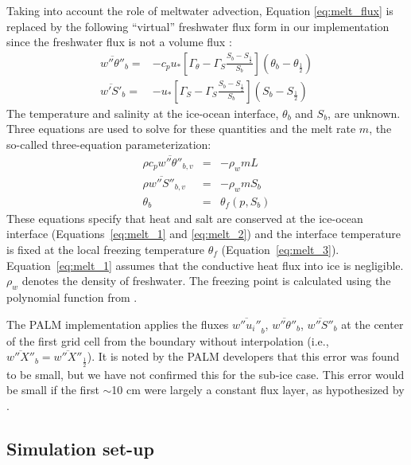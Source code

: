 \documentclass[draft]{styles/agujournal2019}
\begin{document}
Taking into account the role of meltwater advection, Equation \ref{eq:melt_flux} is replaced by the following ``virtual'' freshwater flux form in our implementation since the freshwater flux is not a volume flux \cite{jenkins_role_2001, asay-davis_experimental_2016}:
\begin{eqnarray}
    \overline{w''\theta''}_b =& -c_p u_*
    \left[\Gamma_{\theta} - \Gamma_S \frac{S_b - S_{\frac{1}{2}}}{S_b}\right]\left(\theta_b-\theta_{\frac{1}{2}}\right) \label{eq:vflux_heat}\\
    \overline{w'S'}_b =& -u_*
    \left[\Gamma_S - \Gamma_S \frac{S_b - S_{\frac{1}{2}}}{S_b}\right]\left(S_b-S_{\frac{1}{2}}\right) \label{eq:vflux_salt}
\end{eqnarray}
%
The temperature and salinity at the ice-ocean interface, $\theta_b$ and $S_b$, are unknown. Three equations are used to solve for these quantities and the melt rate $m$, the so-called three-equation parameterization:
%
\begin{eqnarray}
    \rho c_p \overline{w''\theta''}_{b,v} &=& -\rho_w m L \label{eq:melt_1}\\
    \rho \overline{w''S''}_{b,v} &=& −\rho_w m S_b \label{eq:melt_2}\\
    \theta_b &=& \theta_f(p,S_b) \label{eq:melt_3}
\end{eqnarray}
%
These equations specify that heat and salt are conserved at the ice-ocean interface (Equations~\ref{eq:melt_1} and \ref{eq:melt_2}) and the interface temperature is fixed at the local freezing temperature $\theta_f$ (Equation~\ref{eq:melt_3}). Equation~\ref{eq:melt_1} assumes that the conductive heat flux into ice is negligible. $\rho_w$ denotes the density of freshwater. The freezing point is calculated using the polynomial function from .

The PALM implementation applies the fluxes $\overline{w''u_i''}_b$, $\overline{w''\theta''}_b$, $\overline{w''S''}_b$ at the center of the first grid cell from the boundary without interpolation (i.e., $\overline{w''X''}_b = \overline{w''X''}_{\frac{1}{2}}$). It is noted by the PALM developers that this error was found to be small, but we have not confirmed this for the sub-ice case. This error would be small if the first $\sim$10 \unit{cm} were largely a constant flux layer, as hypothesized by . 


\subsection{Simulation set-up}\label{meth:setup}
\end{document}
